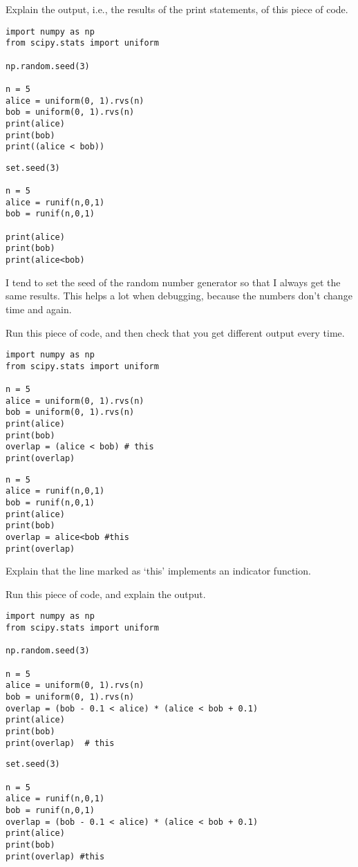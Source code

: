 \begin{exercise}
Explain the output, i.e., the results of the print statements, of this piece of code.
\begin{verbatim}
import numpy as np
from scipy.stats import uniform

np.random.seed(3)

n = 5
alice = uniform(0, 1).rvs(n)
bob = uniform(0, 1).rvs(n)
print(alice)
print(bob)
print((alice < bob))
\end{verbatim}

\begin{verbatim}
set.seed(3)

n = 5
alice = runif(n,0,1)
bob = runif(n,0,1)

print(alice)
print(bob)
print(alice<bob)
\end{verbatim}

I tend to set the seed of the random number generator so that I always get the same results. This helps a lot when debugging, because the numbers don't change time and again.
\end{exercise}

\begin{exercise}
Run  this piece of code, and then check that you get different output every time.
\begin{verbatim}
import numpy as np
from scipy.stats import uniform

n = 5
alice = uniform(0, 1).rvs(n)
bob = uniform(0, 1).rvs(n)
print(alice)
print(bob)
overlap = (alice < bob) # this
print(overlap)
\end{verbatim}

\begin{verbatim}
n = 5
alice = runif(n,0,1)
bob = runif(n,0,1)
print(alice)
print(bob)
overlap = alice<bob #this
print(overlap)
\end{verbatim}

Explain that the line marked as `this' implements an indicator function.
\end{exercise}


\begin{exercise}
Run  this piece of code, and explain the output.
\begin{verbatim}
import numpy as np
from scipy.stats import uniform

np.random.seed(3)

n = 5
alice = uniform(0, 1).rvs(n)
bob = uniform(0, 1).rvs(n)
overlap = (bob - 0.1 < alice) * (alice < bob + 0.1)
print(alice)
print(bob)
print(overlap)  # this
\end{verbatim}

\begin{verbatim}
set.seed(3)

n = 5
alice = runif(n,0,1)
bob = runif(n,0,1)
overlap = (bob - 0.1 < alice) * (alice < bob + 0.1)
print(alice)
print(bob)
print(overlap) #this
\end{verbatim}

\end{exercise}

